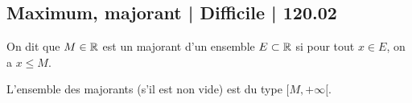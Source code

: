 \subsection{Maximum, majorant | Difficile | 120.02}


\begin{question}
On dit que $M \in \mathbb{R}$ est un majorant d'un ensemble $E \subset \mathbb{R}$ si pour tout $x\in E$, on a $x \le M$.
\begin{answers}



\end{answers}
\begin{explanations}
L'ensemble des majorants (s'il est non vide) est du type $[M,+\infty[$.
\end{explanations}
\end{question}


